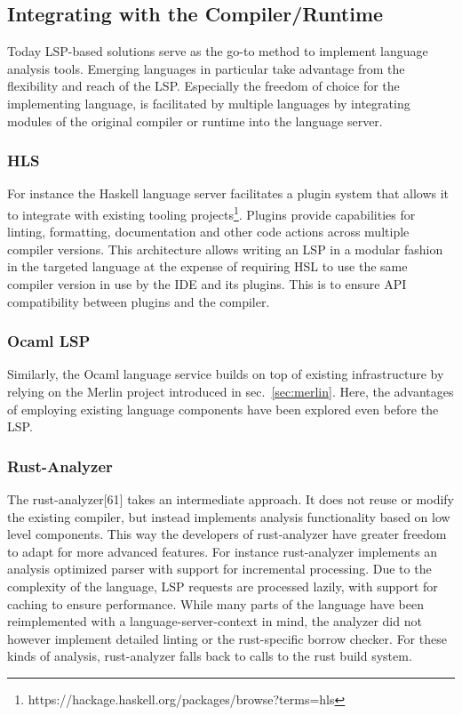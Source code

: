 \documentclass[
  a4paper,
  bibtex,
  english,
  nomenclature]{kthlatex/kththesis/kththesis}
\begin{document}
\hypertarget{sec:integrating-with-the-compilerruntime}{%
\subsection{Integrating with the
Compiler/Runtime}\label{sec:integrating-with-the-compilerruntime}}

Today LSP-based solutions serve as the go-to method to implement
language analysis tools. Emerging languages in particular take advantage
from the flexibility and reach of the LSP. Especially the freedom of
choice for the implementing language, is facilitated by multiple
languages by integrating modules of the original compiler or runtime
into the language server.

\hypertarget{sec:hls}{%
\subsubsection{HLS}\label{sec:hls}}

For instance the Haskell language server facilitates a plugin system
that allows it to integrate with existing tooling projects\footnote{https://hackage.haskell.org/packages/browse?terms=hls}.
Plugins provide capabilities for linting, formatting, documentation and
other code actions across multiple compiler versions. This architecture
allows writing an LSP in a modular fashion in the targeted language at
the expense of requiring HSL to use the same compiler version in use by
the IDE and its plugins. This is to ensure API compatibility between
plugins and the compiler.

\hypertarget{sec:ocaml-lsp}{%
\subsubsection{Ocaml LSP}\label{sec:ocaml-lsp}}

Similarly, the Ocaml language service builds on top of existing
infrastructure by relying on the Merlin project introduced in
sec.~\ref{sec:merlin}. Here, the advantages of employing existing
language components have been explored even before the LSP.

\hypertarget{sec:rust-analyzer}{%
\subsubsection{Rust-Analyzer}\label{sec:rust-analyzer}}

The rust-analyzer{[}61{]} takes an intermediate approach. It does not
reuse or modify the existing compiler, but instead implements analysis
functionality based on low level components. This way the developers of
rust-analyzer have greater freedom to adapt for more advanced features.
For instance rust-analyzer implements an analysis optimized parser with
support for incremental processing. Due to the complexity of the
language, LSP requests are processed lazily, with support for caching to
ensure performance. While many parts of the language have been
reimplemented with a language-server-context in mind, the analyzer did
not however implement detailed linting or the rust-specific borrow
checker. For these kinds of analysis, rust-analyzer falls back to calls
to the rust build system.
\end{document}
